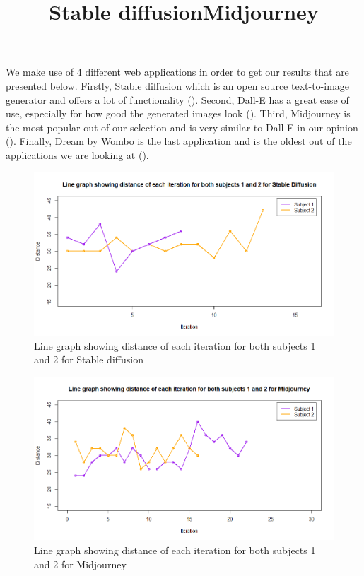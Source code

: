 \documentclass[]{report}
\begin{document}
	We make use of 4 different web applications in order to get our results that are presented below. Firstly, Stable diffusion which is an open source text-to-image generator and offers a lot of functionality (\cite{stableDiff}). Second, Dall-E has a great ease of use, especially for how good the generated images look (\cite{dallE}). Third, Midjourney is the most popular out of our selection and is very similar to Dall-E in our opinion (\cite{midjourney}). Finally, Dream by Wombo is the last application and is the oldest out of the applications we are looking at (\cite{dreamByWombo}).
	
	\begin{figure}[!!htbp]
		\centering
		\bfseries
		\title{Stable diffusion}
		\includegraphics[width=1\linewidth, trim=0 0 0 50, clip]{LineGraphStableDiff}
		\caption{Line graph showing distance of each iteration for both subjects 1 and 2 for Stable diffusion}
		\label{fig:linegraphstablediff}
	\end{figure}
	
	\begin{figure}[!htbp]
		\centering
		\bfseries
		\title{Midjourney}
		\includegraphics[width=1\linewidth, trim=0 0 0 50, clip]{LineGraphMidJ}
		\caption{Line graph showing distance of each iteration for both subjects 1 and 2 for Midjourney}
		\label{fig:linegraphmidj}
	\end{figure}
	
\end{document}
